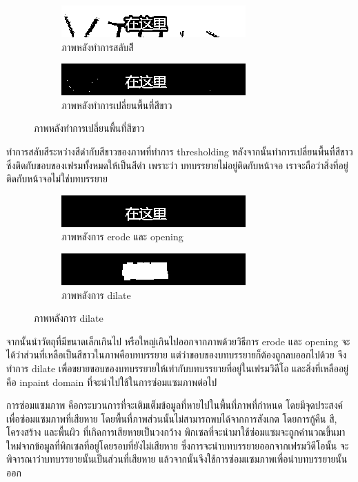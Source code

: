 \documentclass[hidelinks,a4paper,14pt]{article}
\numberwithin{equation}{section}							%
\begin{document}
{\begin{figure}[H]
	\begin{subfigure}{0.4\linewidth}
		\centering
		\includegraphics[width=0.4\linewidth]{images/detection-inverse.png}
		\caption{ภาพหลังทำการสลับสีี}
	\end{subfigure}
	\begin{subfigure}{0.4\linewidth}
		\centering
		\includegraphics[width=0.4\linewidth]{images/detection-blackfill.png}
		\caption{ภาพหลังทำการเปลี่ยนพื้นที่สีขาว}
	\end{subfigure}
\end{figure}

ทำการสลับสีระหว่างสีดำกับสีขาวของภาพที่ทำการ thresholding หลังจากนั้นทำการเปลี่ยนพื้นที่สีขาวซึ่งติดกับขอบของเฟรมทั้งหมดให้เป็นสีดำ เพราะว่า บทบรรยายไม่อยู่ติดกับหน้าจอ เราจะถือว่าสิ่งที่อยู่ติดกับหน้าจอไม่ใช่บทบรรยาย

\begin{figure}[H]
	\begin{subfigure}{0.4\linewidth}
		\centering
		\includegraphics[width=0.4\linewidth]{images/detection-erode-opening.png}
		\caption{ภาพหลังการ erode และ opening}
	\end{subfigure}
	\begin{subfigure}{0.4\linewidth}
		\centering
		\includegraphics[width=0.4\linewidth]{images/detection-stoke.png}
		\caption{ภาพหลังการ dilate}
	\end{subfigure}
\end{figure}

จากนั้นนำวัตถุที่มีขนาดเล็กเกินไป หรือใหญ่เกินไปออกจากภาพด้วยวิธีการ erode และ opening
จะได้ว่าส่วนที่เหลือเป็นสีขาวในภาพคือบทบรรยาย แต่ว่าขอบของบทบรรยายก็ต้องถูกลบออกไปด้วย จึงทำการ dilate เพื่อขยายขอบของบทบรรยายให้เท่ากับบทบรรยายที่อยู่ในเฟรมวิดีโอ และสิ่งที่เหลืออยู่คือ inpaint domain ที่จะนำไปใช้ในการซ่อมแซมภาพต่อไป
	
	การซ่อมแซมภาพ คือกระบวนการที่จะเติมเต็มข้อมูลที่หายไปในพื้นที่ภาพที่กำหนด โดยมีจุดประสงค์เพื่อซ่อมแซมภาพที่เสียหาย โดยพื้นที่ภาพส่วนนั้นไม่สามารถพบได้จากการสังเกต โดยการกู้คืน สี, โครงสร้าง และพื้นผิว ที่เกิดการเสียหายเป็นวงกว้าง พิกเซลที่จะนำมาใช้ซ่อมแซมจะถูกคำนวณขึ้นมาใหม่จากข้อมูลที่พิกเซลที่อยู่โดยรอบที่ยังไม่เสียหาย \cite{ref:defination-of-inpaint}  ซึ่งการจะนำบทบรรยายออกจากเฟรมวิดีโอนั้น จะพิจารณาว่าบทบรรยายนั้นเป็นส่วนที่เสียหาย แล้วจากนั้นจึงใช้การซ่อมแซมภาพเพื่อนำบทบรรยายนั้นออก\newline
	
}
\end{document}
